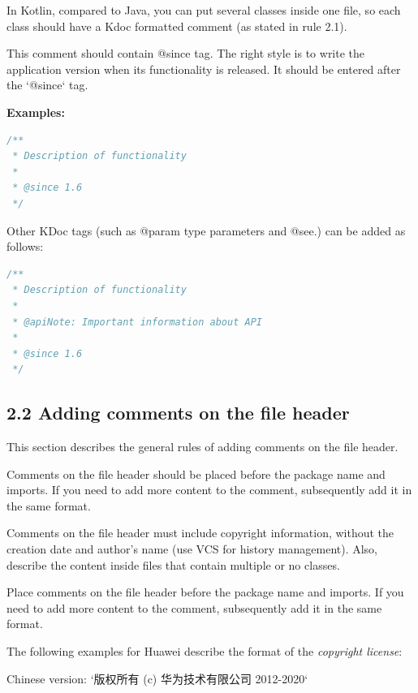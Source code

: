 In Kotlin, compared to Java, you can put several classes inside one file, so each class should have a Kdoc formatted comment (as stated in rule 2.1).

This comment should contain @since tag. The right style is to write the application version when its functionality is released. It should be entered after the `@since` tag.



\textbf{Examples:}



\begin{lstlisting}[language=Kotlin]
/**
 * Description of functionality
 *
 * @since 1.6
 */
\end{lstlisting}


Other KDoc tags (such as @param type parameters and @see.) can be added as follows:

\begin{lstlisting}[language=Kotlin]
/**
 * Description of functionality
 *
 * @apiNote: Important information about API
 *
 * @since 1.6
 */
\end{lstlisting}


\subsection*{\textbf{2.2 Adding comments on the file header}}



This section describes the general rules of adding comments on the file header.

Comments on the file header should be placed before the package name and imports. If you need to add more content to the comment, subsequently add it in the same format.



Comments on the file header must include copyright information, without the creation date and author's name (use VCS for history management). Also, describe the content inside files that contain multiple or no classes.



Place comments on the file header before the package name and imports. If you need to add more content to the comment, subsequently add it in the same format.



The following examples for Huawei describe the format of the \textit{copyright license}: \

Chinese version: `版权所有 (c) 华为技术有限公司 2012-2020` \

